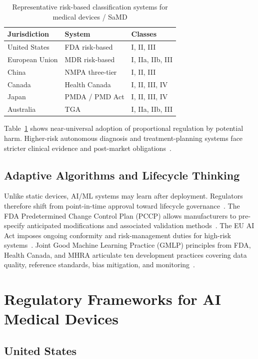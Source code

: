 \begin{table}[htbp]
\centering
\caption{Representative risk-based classification systems for medical devices / SaMD}
\label{tab:risk}
\begin{tabular}{@{}lll@{}}
\toprule
\textbf{Jurisdiction} & \textbf{System} & \textbf{Classes} \\
\midrule
United States & FDA risk-based & I, II, III \\
European Union & MDR risk-based & I, IIa, IIb, III \\
China & NMPA three-tier & I, II, III \\
Canada & Health Canada & I, II, III, IV \\
Japan & PMDA / PMD Act & I, II, III, IV \\
Australia & TGA & I, IIa, IIb, III \\
\bottomrule
\end{tabular}
\end{table}

Table~\ref{tab:risk} shows near-universal adoption of proportional regulation by potential harm. Higher-risk autonomous diagnosis and treatment-planning systems face stricter clinical evidence and post-market obligations~\cite{muehlematter2021}.

\subsection{Adaptive Algorithms and Lifecycle Thinking}

Unlike static devices, AI/ML systems may learn after deployment. Regulators therefore shift from point-in-time approval toward lifecycle governance~\cite{babic2019,hwang2019}. The FDA Predetermined Change Control Plan (PCCP) allows manufacturers to pre-specify anticipated modifications and associated validation methods~\cite{fda2023}. The EU AI Act imposes ongoing conformity and risk-management duties for high-risk systems~\cite{euaiact2024}. Joint Good Machine Learning Practice (GMLP) principles from FDA, Health Canada, and MHRA articulate ten development practices covering data quality, reference standards, bias mitigation, and monitoring~\cite{gmlp2021}.

\section{Regulatory Frameworks for AI Medical Devices}
\label{sec:regframeworks}

\subsection{United States}

